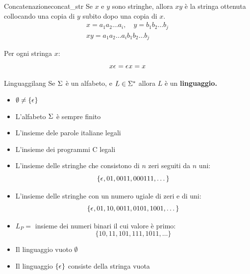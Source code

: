 \documentclass[11pt, a4paper]{article}
\begin{document}
%
\begin{definition}{Concatenazione}{concat_str}
    Se $x$ e $y$ sono stringhe, allora $xy$ è la stringa ottenuta collocando una copia di $y$ subito dopo una copia di $x$.
    \begin{equation*}
        \begin{matrix}
            x = a_1a_2\dots a_i, \quad y = b_1b_2\dots b_j \\
            xy = a_1a_2\dots a_i b_1b_2\dots b_j
        \end{matrix}
    \end{equation*}
    \begin{note}{}{}
        Per ogni stringa $x$:
        \[ x\eps = \eps x = x \]
    \end{note}
\end{definition}
%
\begin{definition}{Linguaggi}{lang}
    Se $\Si$ è un alfabeto, e $L \in \Si[*]$ allora $L$ è un \bf{linguaggio}.
    \begin{itemize}
        \item $\emptyset \not= \{\eps\}$
        \item L'alfabeto $\Si$ è sempre finito
    \end{itemize}
    \begin{example}{}{}
        \begin{itemize}
            \item L'insieme dele parole italiane legali
            \item L'insieme dei programmi C legali
            \item L'insieme delle stringhe che consistono di $n$ zeri seguiti da $n$ uni:
                \[
                    \{\eps, 01, 0011, 000111, \dots \}
                \]
            \item L'insieme delle stringhe con un numero ugiale di zeri e di uni:
                \[
                    \{\eps, 01, 10, 0011, 0101, 1001, \dots \}
                \]
            \item $L_P =$ insieme dei numeri binari il cui valore è primo:
                \[
                    \{10, 11, 101, 111, 1011, \dots \}
                \]
            \item Il linguaggio vuoto $\emptyset$
            \item Il linguaggio $\{\eps\}$ consiste della stringa vuota
        \end{itemize}
    \end{example}
\end{definition}
%
%
\end{document}

